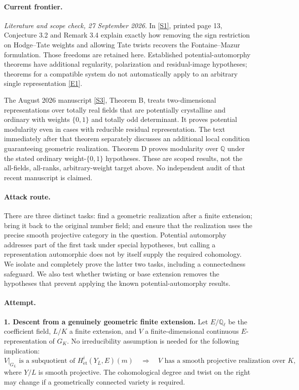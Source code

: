\documentclass[11pt,a4paper]{article}
\newcommand{\Q}{\mathbb{Q}}
\newcommand{\sref}[2]{\hyperlink{source:#1:#2}{[S#2]}}
\newcommand{\eref}[2]{\hyperlink{extra:#1:#2}{[E#2]}}
\numberwithin{equation}{section}
\begin{document}
\paragraph{Current frontier.}
\textit{Literature and scope check, 27 September 2026.}
In \sref{9400048}{1}, printed page 13, Conjecture 3.2 and Remark 3.4 explain
exactly how removing the sign restriction on Hodge--Tate weights and allowing
Tate twists recovers the Fontaine--Mazur formulation. Those freedoms are
retained here. Established potential-automorphy theorems have additional
regularity, polarization and residual-image hypotheses; theorems for a
compatible system do not automatically apply to an arbitrary single
representation \eref{9400048}{1}.

The August 2026 manuscript \sref{9400048}{3}, Theorem B, treats two-dimensional
representations over totally real fields that are potentially crystalline
and ordinary with weights $\{0,1\}$ and totally odd determinant. It proves
potential modularity even in cases with reducible residual representation.
The text immediately after that theorem separately discusses an additional
local condition guaranteeing geometric realization. Theorem D proves
modularity over $\Q$ under the stated ordinary weight-$\{0,1\}$ hypotheses.
These are scoped results, not the all-fields, all-ranks, arbitrary-weight
target above. No independent audit of that recent manuscript is claimed.

\paragraph{Attack route.}
There are three distinct tasks: find a geometric realization after a finite
extension; bring it back to the original number field; and ensure that the
realization uses the precise smooth projective category in the question.
Potential automorphy addresses part of the first task under special
hypotheses, but calling a representation automorphic does not by itself
supply the required cohomology. We isolate and completely prove the latter
two tasks, including a connectedness safeguard. We also test whether twisting
or base extension removes the hypotheses that prevent applying the known
potential-automorphy results.

\paragraph{Attempt.}
\textbf{1. Descent from a genuinely geometric finite extension.}
Let $E/\Q_\ell$ be the coefficient field, $L/K$ a finite extension, and
$V$ a finite-dimensional continuous $E$-representation of $G_K$. No
irreducibility assumption is needed for the following implication:
\begin{equation}\label{eq:9400048:potential}
 \left.V\right|_{G_L}\text{ is a subquotient of }
 H^i_{\mathrm{\acute et}}(Y_{\bar L},E)(m)
 \quad\Longrightarrow\quad
 V\text{ has a smooth projective realization over }K,
\end{equation}
where $Y/L$ is smooth projective. The cohomological degree and twist on the
right may change if a geometrically connected variety is required.
\end{document}
